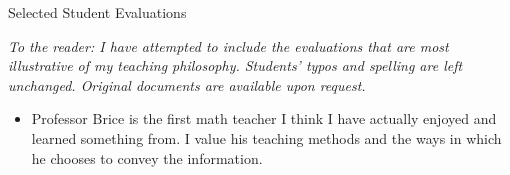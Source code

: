 \documentclass[11pt]{article}
\begin{document}

\begin{center}
\huge Selected Student Evaluations
\end{center}

\vfill

\emph{To the reader: I have attempted to include the evaluations that are most illustrative of my teaching philosophy. Students' typos and spelling are left unchanged. Original documents are available upon request.}

	\begin{itemize}

		\item{} Professor Brice is the first math teacher I think I have actually enjoyed and learned something from. I value his teaching methods and the ways in which he chooses to convey the information.
	\end{itemize}
\end{document}
